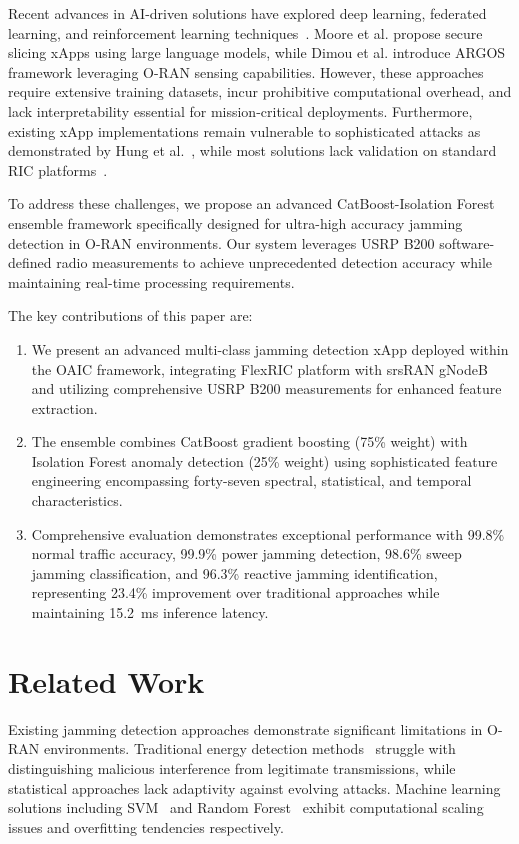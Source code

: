 \documentclass[journal]{IEEEtran}
\begin{document}
Recent advances in AI-driven solutions have explored deep learning, federated learning, and reinforcement learning techniques~\cite{moore2025, dimou2025}. Moore et al. propose secure slicing xApps using large language models, while Dimou et al. introduce ARGOS framework leveraging O-RAN sensing capabilities. However, these approaches require extensive training datasets, incur prohibitive computational overhead, and lack interpretability essential for mission-critical deployments. Furthermore, existing xApp implementations remain vulnerable to sophisticated attacks as demonstrated by Hung et al.~\cite{hung2024, hung2025}, while most solutions lack validation on standard RIC platforms~\cite{moore2023}.

To address these challenges, we propose an advanced CatBoost-Isolation Forest ensemble framework specifically designed for ultra-high accuracy jamming detection in O-RAN environments. Our system leverages USRP B200 software-defined radio measurements to achieve unprecedented detection accuracy while maintaining real-time processing requirements.

The key contributions of this paper are:
\begin{enumerate}
    \item We present an advanced multi-class jamming detection xApp deployed within the OAIC framework, integrating FlexRIC platform with srsRAN gNodeB and utilizing comprehensive USRP B200 measurements for enhanced feature extraction.
    \item The ensemble combines CatBoost gradient boosting (75\% weight) with Isolation Forest anomaly detection (25\% weight) using sophisticated feature engineering encompassing forty-seven spectral, statistical, and temporal characteristics.
    \item Comprehensive evaluation demonstrates exceptional performance with 99.8\% normal traffic accuracy, 99.9\% power jamming detection, 98.6\% sweep jamming classification, and 96.3\% reactive jamming identification, representing 23.4\% improvement over traditional approaches while maintaining 15.2~ms inference latency.
\end{enumerate}

\section{Related Work}

Existing jamming detection approaches demonstrate significant limitations in O-RAN environments. Traditional energy detection methods~\cite{kryszkiewicz2023} struggle with distinguishing malicious interference from legitimate transmissions, while statistical approaches lack adaptivity against evolving attacks. Machine learning solutions including SVM~\cite{Lin2024} and Random Forest~\cite{Toai2023} exhibit computational scaling issues and overfitting tendencies respectively.
\end{document}
